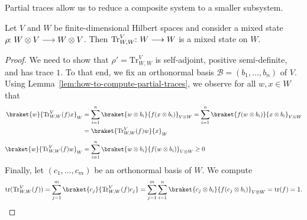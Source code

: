 \documentclass[a4paper, oneside, 12pt]{amsart}
\begin{document}
Partial traces allow us to reduce a composite system to a smaller subsystem.

\begin{proposition}\label{prop:reduction-via-partial-trace}
  Let \(V\) and \(W\) be finite-dimensional Hilbert spaces and consider a mixed state \(\rho \from W\otimes V \to W\otimes V\).
  Then \(\mathrm{Tr}^{V}_{W,W} \from W\to W\) is a mixed state on \(W\).
\end{proposition}

\begin{proof}
  We need to show that \( \rho'= \mathrm{Tr}^{V}_{W,W}\) is self-adjoint, positive semi-definite, and has trace \(1\).
  To that end, we fix an orthonormal basis \(\mathcal{B} = (b_{1}, \dots , b_{n})\) of \(V\).
  Using Lemma~\ref{lem:how-to-compute-partial-traces}, we observe for all \(w,x\in W\) that
  \begin{align*}
    \braket{w}{\mathrm{Tr}_{W,W}^{V}(f) x}_{W}
    & = \sum_{i=1}^{n} \braket{w \otimes b_{i}}{f(x\otimes b_{i})}_{V\otimes W}
      = \sum_{i=1}^{n} \braket{f(w \otimes b_{i})}{x\otimes b_{i}}_{V\otimes W}\\
    &  = \braket{\mathrm{Tr}_{W,W}^{V}(f) w}{x}_{W}\\[0.25\baselineskip]
    \braket{w}{\mathrm{Tr}_{W,W}^{V}(f) w}_{W}
     & = \sum_{i=1}^{n} \braket{w \otimes b_{i}}{f(w\otimes b_{i})}_{V\otimes W}\geq 0
  \end{align*}
  Finally, let \((c_{1}, \dots , c_{m})\) be an orthonormal basis of \(W\).
  We compute
  \begin{equation*}
    \tr(\mathrm{Tr}_{W,W}^{V}(f))
    = \sum_{j=1}^{m}\braket{c_{j}}{\mathrm{Tr}_{W,W}^{V}(f)c_{j}}
    = \sum_{j=1}^{m}\sum_{i=1}^{n} \braket{c_{j} \otimes b_{i}}{f(c_{j}\otimes b_{i})}_{V\otimes W}
    = \tr(f)
    = 1.\qedhere
  \end{equation*}
\end{proof}
\end{document}
